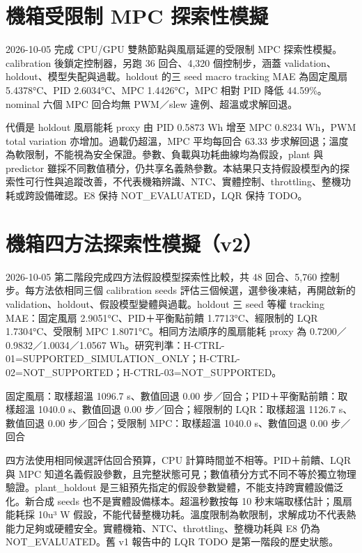 \documentclass[12pt,a4paper]{article}
\begin{document}
\section*{機箱受限制 MPC 探索性模擬}

2026-10-05 完成 CPU/GPU 雙熱節點與風扇延遲的受限制 MPC 探索性模擬。calibration 後鎖定控制器，另跑 36 回合、4,320 個控制步，涵蓋 validation、holdout、模型失配與過載。holdout 的三 seed macro tracking MAE 為固定風扇 5.4378°C、PID 2.6034°C、MPC 1.4426°C，MPC 相對 PID 降低 44.59\%。nominal 六個 MPC 回合均無 PWM／slew 違例、超溫或求解回退。


代價是 holdout 風扇能耗 proxy 由 PID 0.5873 Wh 增至 MPC 0.8234 Wh，PWM total variation 亦增加。過載仍超溫，MPC 平均每回合 63.33 步求解回退；溫度為軟限制，不能視為安全保證。參數、負載與功耗曲線均為假設，plant 與 predictor 雖採不同數值積分，仍共享名義熱參數。本結果只支持假設模型內的探索性可行性與追蹤改善，不代表機箱辨識、NTC、實體控制、throttling、整機功耗或跨設備確認。E8 保持 NOT\_\allowbreak{}EVALUATED，LQR 保持 TODO。


\section*{機箱四方法探索性模擬（v2）}

2026-10-05 第二階段完成四方法假設模型探索性比較，共 48 回合、5,760 控制步。每方法依相同三個 calibration seeds 評估三個候選，選參後凍結，再開啟新的 validation、holdout、假設模型變體與過載。holdout 三 seed 等權 tracking MAE：固定風扇 2.9051°C、PID＋平衡點前饋 1.7713°C、經限制的 LQR 1.7304°C、受限制 MPC 1.8071°C。相同方法順序的風扇能耗 proxy 為 0.7200／0.9832／1.0034／1.0567 Wh。研究判準：H-CTRL-01=SUPPORTED\_\allowbreak{}SIMULATION\_\allowbreak{}ONLY；H-CTRL-02=NOT\_\allowbreak{}SUPPORTED；H-CTRL-03=NOT\_\allowbreak{}SUPPORTED。


固定風扇：取樣超溫 1096.7 s、數值回退 0.00 步／回合；PID＋平衡點前饋：取樣超溫 1040.0 s、數值回退 0.00 步／回合；經限制的 LQR：取樣超溫 1126.7 s、數值回退 0.00 步／回合；受限制 MPC：取樣超溫 1040.0 s、數值回退 0.00 步／回合


四方法使用相同候選評估回合預算，CPU 計算時間並不相等。PID＋前饋、LQR 與 MPC 知道名義假設參數，且完整狀態可見；數值積分方式不同不等於獨立物理驗證。plant\_\allowbreak{}holdout 是三組預先指定的假設參數變體，不能支持跨實體設備泛化。新合成 seeds 也不是實體設備樣本。超溫秒數按每 10 秒末端取樣估計；風扇能耗採 10u³ W 假設，不能代替整機功耗。溫度限制為軟限制，求解成功不代表熱能力足夠或硬體安全。實體機箱、NTC、throttling、整機功耗與 E8 仍為 NOT\_\allowbreak{}EVALUATED。舊 v1 報告中的 LQR TODO 是第一階段的歷史狀態。
\end{document}
